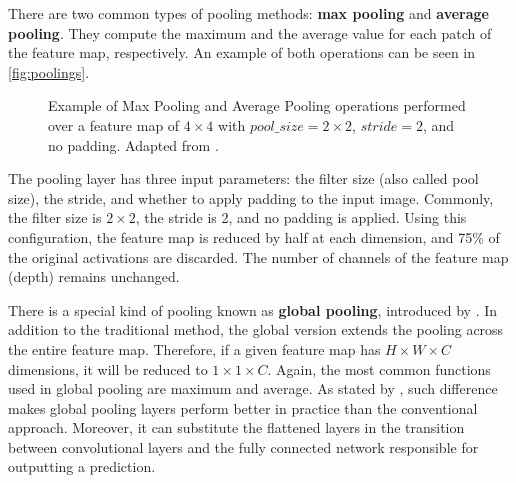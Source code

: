 There are two common types of pooling methods: \textbf{max pooling} and \textbf{average pooling}. They compute the maximum and the average value for each patch of the feature map, respectively. An example of both operations can be seen in \autoref{fig:poolings}.

\begin{figure}[tb]
\centering
{}
\hfill
{}    
\caption{Example of Max Pooling and Average Pooling operations performed over a feature map of $4 \times 4$ with $pool\_size=2 \times 2$, $stride=2$, and no padding. Adapted from \citep{guissousallaeddine2019}.}
\label{fig:poolings}
\end{figure}

The pooling layer has three input parameters: the filter size (also called pool size), the stride, and whether to apply padding to the input image. Commonly, the filter size is $2 \times 2$, the stride is 2, and no padding is applied. Using this configuration, the feature map is reduced by half at each dimension, and 75\% of the original activations are discarded. The number of channels of the feature map (depth) remains unchanged.

There is a special kind of pooling known as \textbf{global pooling}, introduced by \cite{lin2013network}. In addition to the traditional method, the global version extends the pooling across the entire feature map. Therefore, if a given feature map has $H \times W \times C$ dimensions, it will be reduced to $1 \times 1 \times C$. Again, the most common functions used in global pooling are maximum and average. As stated by \cite{zhou2016learning}, such difference makes global pooling layers perform better in practice than the conventional approach. Moreover, it can substitute the flattened layers in the transition between convolutional layers and the fully connected network responsible for outputting a prediction.

